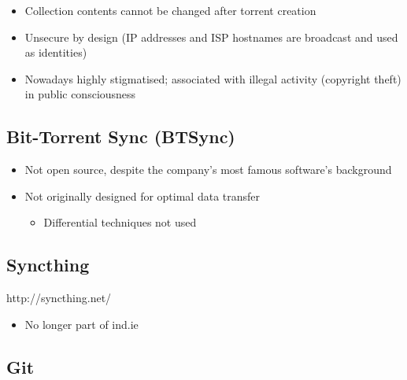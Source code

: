\documentclass[12pt,a4paper,]{adreport}
\begin{document}
\begin{itemize}
\itemsep1pt\parskip0pt
\item
  Collection contents cannot be changed after torrent creation
\item
  Unsecure by design (IP addresses and ISP hostnames are broadcast and
  used as identities)
\item
  Nowadays highly stigmatised; associated with illegal activity
  (copyright theft) in public consciousness
\end{itemize}

\subsection{Bit-Torrent Sync (BTSync)}\label{bit-torrent-sync-btsync}

\begin{itemize}
\itemsep1pt\parskip0pt
\item
  Not open source, despite the company's most famous software's
  background
\item
  Not originally designed for optimal data transfer

  \begin{itemize}
  \itemsep1pt\parskip0pt
  \item
    Differential techniques not used
  \end{itemize}
\end{itemize}

\subsection{Syncthing}\label{syncthing}

http://syncthing.net/

\begin{itemize}
\itemsep1pt\parskip0pt
\item
  No longer part of ind.ie
\end{itemize}

\subsection{Git}\label{git}
\end{document}
